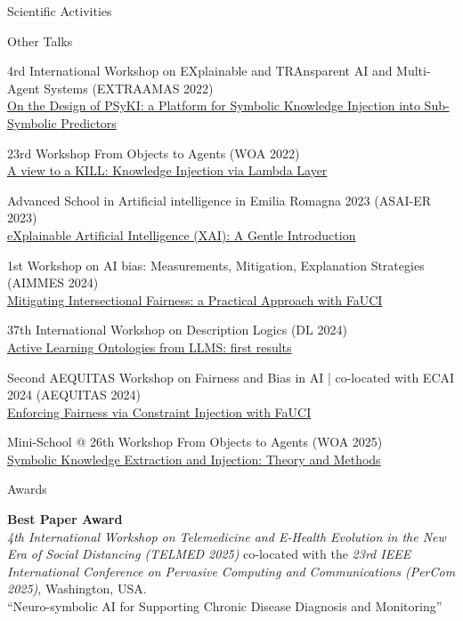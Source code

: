 \documentclass{resume} %
\begin{document}
\begin{rSection}{Scientific Activities}
        \begin{rSubsection2}{Other Talks}
            \item 4rd International Workshop on EXplainable and TRAnsparent AI and Multi-Agent Systems (EXTRAAMAS 2022)
            \\\href{https://apice.unibo.it/xwiki/bin/view/Talk/PsykiExtraamas2022}{On the Design of PSyKI: a Platform for Symbolic Knowledge Injection into Sub-Symbolic Predictors}
            \item 23rd Workshop From Objects to Agents (WOA 2022)
            \\\href{https://apice.unibo.it/xwiki/bin/view/Talk/KillWoa2022}{A view to a KILL: Knowledge Injection via Lambda Layer}
            \item Advanced School in Artificial intelligence in Emilia Romagna 2023 (ASAI-ER 2023)
            \\\href{https://apice.unibo.it/xwiki/bin/view/Talk/XaiAsaiErBertinoro2023}{eXplainable Artificial Intelligence (XAI): A Gentle Introduction}
            \item 1st Workshop on AI bias: Measurements, Mitigation, Explanation Strategies (AIMMES 2024)
            \\\href{https://apice.unibo.it/xwiki/bin/view/Talk/IntersectionalityAimmes2024}{Mitigating Intersectional Fairness: a Practical Approach with FaUCI}
            \item 37th International Workshop on Description Logics (DL 2024)
            \\\href{https://dl2024.w.uib.no/overview/}{Active Learning Ontologies from LLMS: first results}
            \item Second AEQUITAS Workshop on Fairness and Bias in AI | co-located with ECAI 2024 (AEQUITAS 2024)
            \\\href{https://apice.unibo.it/xwiki/bin/view/Talk/FauciAequitas2024}{Enforcing Fairness via Constraint Injection with FaUCI}
            \item Mini-School @ 26th Workshop From Objects to Agents (WOA 2025)
            \\\href{https://sites.google.com/view/woa2025/mini-school?}{Symbolic Knowledge Extraction and Injection: Theory and Methods}
        \end{rSubsection2}


        \begin{rSubsection2}{Awards}
            \item \textbf{Best Paper Award}
            \\
            \textit{4th International Workshop on Telemedicine and E-Health Evolution in the New Era of Social Distancing (TELMED 2025)} co-located with the \textit{23rd IEEE International Conference on Pervasive Computing and Communications (PerCom 2025)}, Washington, USA.
            \\
            ``Neuro-symbolic AI for Supporting Chronic Disease Diagnosis and Monitoring''


\end{rSubsection2}
\end{rSection}
\end{document}
